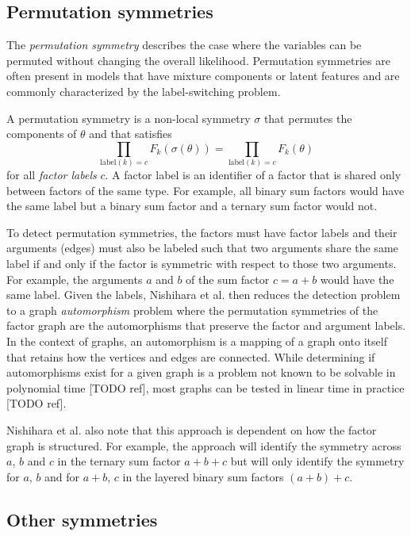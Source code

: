 \subsection{Permutation symmetries} \label{sec:permutation}

The \textit{permutation symmetry} describes the case where the variables can be permuted without changing the overall likelihood. Permutation symmetries are often present in models that have mixture components or latent features and are commonly characterized by the label-switching problem.

\begin{defn}
A permutation symmetry is a non-local symmetry $\sigma$ that permutes the components of $\theta$ and that satisfies
\[
\prod_{\text{label}(k)=c}F_k(\sigma(\theta)) = \prod_{\text{label}(k)=c}F_k(\theta)
\]
for all \textit{factor labels} $c$. A factor label is an identifier of a factor that is shared only between factors of the same type. For example, all binary sum factors would have the same label but a binary sum factor and a ternary sum factor would not.
\end{defn}

To detect permutation symmetries, the factors must have factor labels and their arguments (edges) must also be labeled such that two arguments share the same label if and only if the factor is symmetric with respect to those two arguments. For example, the arguments $a$ and $b$ of the sum factor $c=a+b$ would have the same label. Given the labels, Nishihara et al. then reduces the detection problem to a graph \textit{automorphism} problem where the permutation symmetries of the factor graph are the automorphisms that preserve the factor and argument labels. In the context of graphs, an automorphism is a mapping of a graph onto itself that retains how the vertices and edges are connected. While determining if automorphisms exist for a given graph is a problem not known to be solvable in polynomial time [TODO ref], most graphs can be tested in linear time in practice [TODO ref].

Nishihara et al. also note that this approach is dependent on how the factor graph is structured. For example, the approach will identify the symmetry across $a$, $b$ and $c$ in the ternary sum factor $a+b+c$ but will only identify the symmetry for $a$, $b$ and for $a+b$, $c$ in the layered binary sum factors $(a+b)+c$.


\subsection{Other symmetries}

